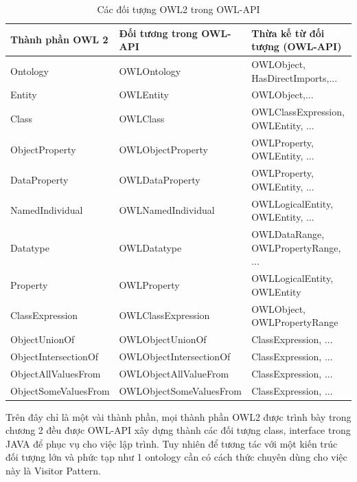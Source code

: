 \begin{table}
	\centering
	\begin{tabular}{|l|l|p{4cm}|}
		\hline
		Thành phần OWL 2 		& Đối tương trong OWL-API 		& Thừa kế từ đối tượng (OWL-API) \\
		\hline
		Ontology 				& OWLOntology 					& OWLObject, HasDirectImports,...  \\ 
		\hline
		Entity 					& OWLEntity 					& OWLObject,...  \\
		\hline
		Class 					& OWLClass 						& OWLClassExpression, OWLEntity, ...   \\		
		\hline
		ObjectProperty 			& OWLObjectProperty 			& OWLProperty, OWLEntity, ...   \\		
		\hline
		DataProperty 			& OWLDataProperty 				& OWLProperty, OWLEntity, ...   \\
		\hline
		NamedIndividual 		& OWLNamedIndividual			& OWLLogicalEntity, OWLEntity, ...  \\
		\hline
		Datatype 				& OWLDatatype 					& OWLDataRange, OWLPropertyRange, ...   \\
		\hline
		Property 				& OWLProperty 					& OWLLogicalEntity, OWLEntity   \\
		\hline
		ClassExpression			& OWLClassExpression			& OWLObject, OWLPropertyRange   \\
		\hline
		ObjectUnionOf			& OWLObjectUnionOf				& ClassExpression, ...\\
		\hline
		ObjectIntersectionOf	& OWLObjectIntersectionOf		& ClassExpression, ... \\
		\hline
		ObjectAllValuesFrom		& OWLObjectAllValueFrom		& ClassExpression, ... \\
		\hline
		ObjectSomeValuesFrom	& OWLObjectSomeValuesFrom		& ClassExpression, ... \\
		\hline
	\end{tabular}
	\caption{Các đối tượng OWL2 trong OWL-API\label{overflow}}
\end{table}
Trên đây chỉ là một vài thành phần, mọi thành phần OWL2 được trình bày trong chương 2 đều được OWL-API xây dựng thành các đối tượng class, interface trong JAVA để phục vụ cho việc lập trình. Tuy nhiên để tương tác với một kiến trúc đối tượng lớn và phức tạp như 1 ontology cần có cách thức chuyên dùng cho việc này là Visitor Pattern.
